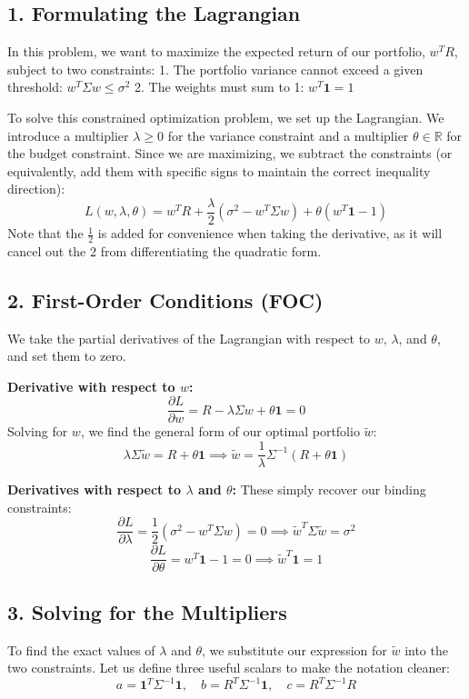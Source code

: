 \subsection*{1. Formulating the Lagrangian}
In this problem, we want to maximize the expected return of our portfolio, $w^T R$, subject to two constraints:
1. The portfolio variance cannot exceed a given threshold: $w^T \Sigma w \le \sigma^2$
2. The weights must sum to 1: $w^T \mathbf{1} = 1$

To solve this constrained optimization problem, we set up the Lagrangian. We introduce a multiplier $\lambda \ge 0$ for the variance constraint and a multiplier $\theta \in \mathbb{R}$ for the budget constraint. Since we are maximizing, we subtract the constraints (or equivalently, add them with specific signs to maintain the correct inequality direction):
$$L(w, \lambda, \theta) = w^T R + \frac{\lambda}{2}(\sigma^2 - w^T \Sigma w) + \theta(w^T \mathbf{1} - 1)$$
Note that the $\frac{1}{2}$ is added for convenience when taking the derivative, as it will cancel out the 2 from differentiating the quadratic form.

\subsection*{2. First-Order Conditions (FOC)}
We take the partial derivatives of the Lagrangian with respect to $w$, $\lambda$, and $\theta$, and set them to zero.

\vspace{0.5em}
\noindent \textbf{Derivative with respect to $w$:}
$$\frac{\partial L}{\partial w} = R - \lambda \Sigma w + \theta \mathbf{1} = 0$$
Solving for $w$, we find the general form of our optimal portfolio $\tilde{w}$:
$$\lambda \Sigma \tilde{w} = R + \theta \mathbf{1} \implies \tilde{w} = \frac{1}{\lambda} \Sigma^{-1} (R + \theta \mathbf{1})$$

\noindent \textbf{Derivatives with respect to $\lambda$ and $\theta$:}
These simply recover our binding constraints:
$$\frac{\partial L}{\partial \lambda} = \frac{1}{2}(\sigma^2 - w^T \Sigma w) = 0 \implies \tilde{w}^T \Sigma \tilde{w} = \sigma^2$$
$$\frac{\partial L}{\partial \theta} = w^T \mathbf{1} - 1 = 0 \implies \tilde{w}^T \mathbf{1} = 1$$

\subsection*{3. Solving for the Multipliers}
To find the exact values of $\lambda$ and $\theta$, we substitute our expression for $\tilde{w}$ into the two constraints. Let us define three useful scalars to make the notation cleaner:
$$a = \mathbf{1}^T \Sigma^{-1} \mathbf{1}, \quad b = R^T \Sigma^{-1} \mathbf{1}, \quad c = R^T \Sigma^{-1} R$$

